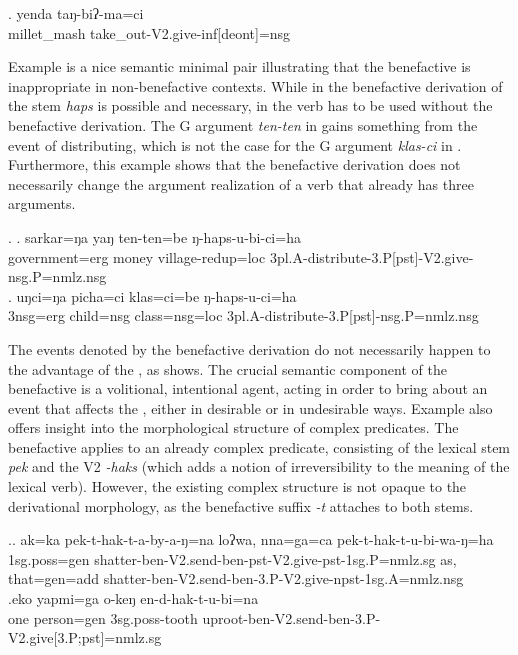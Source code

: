 \exg. yenda taŋ-biʔ-ma=ci\\
millet\_mash take\_out-{\sc V2.give-inf[deont]=nsg}\\
 
 
Example \Next is a nice semantic minimal pair illustrating that the benefactive is inappropriate in non-benefactive contexts. While in \Next[a] the benefactive derivation of the stem \emph{haps}  is possible and necessary, in \Next[b] the verb has to be used without the benefactive derivation. The G argument  \emph{ten-ten}   in \Next[a] gains something from the event of distributing, which is not the case for the G argument \emph{klas-ci}  in \Next[b]. Furthermore, this example shows that the benefactive derivation does not necessarily change the argument realization of a verb that already has three arguments.

 \ex. \ag. sarkar=ŋa yaŋ ten-ten=be ŋ-haps-u-bi-ci=ha\\
government{\sc =erg} money village{\sc -redup=loc}	{\sc 3pl.A-}distribute-{\sc 3.P[pst]-V2.give-nsg.P=nmlz.nsg}\\
 \bg. uŋci=ŋa picha=ci klas=ci=be ŋ-haps-u-ci=ha\\
{\sc 3nsg=erg} child{\sc =nsg} class{\sc =nsg=loc}	{\sc 3pl.A-}distribute-{\sc 3.P[pst]-nsg.P=nmlz.nsg}\\


The events denoted by the benefactive derivation do not necessarily happen to the advantage of the , as \Next shows. The crucial semantic component of the benefactive is a volitional, intentional agent, acting in order to bring about an event that affects the , either in desirable or in undesirable ways. Example \Next also offers insight into the morphological structure of complex predicates. The benefactive applies to an already complex predicate, consisting of the lexical stem \emph{pek}  and the V2 \emph{-haks}  (which adds a notion of irreversibility to the meaning of the lexical verb). However, the existing complex structure is not opaque to the derivational morphology, as the benefactive suffix \emph{-t} attaches to both stems.

\ex.\ag. ak=ka pek-t-hak-t-a-by-a-ŋ=na loʔwa, nna=ga=ca  pek-t-hak-t-u-bi-wa-ŋ=ha\\
{\sc 1sg.poss=gen} shatter-{\sc ben-V2.send-ben-pst-V2.give-pst-1sg.P=nmlz.sg} as,   that{\sc =gen=add} shatter-{\sc ben-V2.send-ben-3.P-V2.give-npst-1sg.A=nmlz.nsg}\\
 
\bg.eko yapmi=ga o-keŋ en-d-hak-t-u-bi=na\\
one person{\sc =gen} {\sc 3sg.poss-}tooth	uproot{\sc -ben-V2.send-ben-3.P-V2.give[3.P;pst]=nmlz.sg}\\
 

